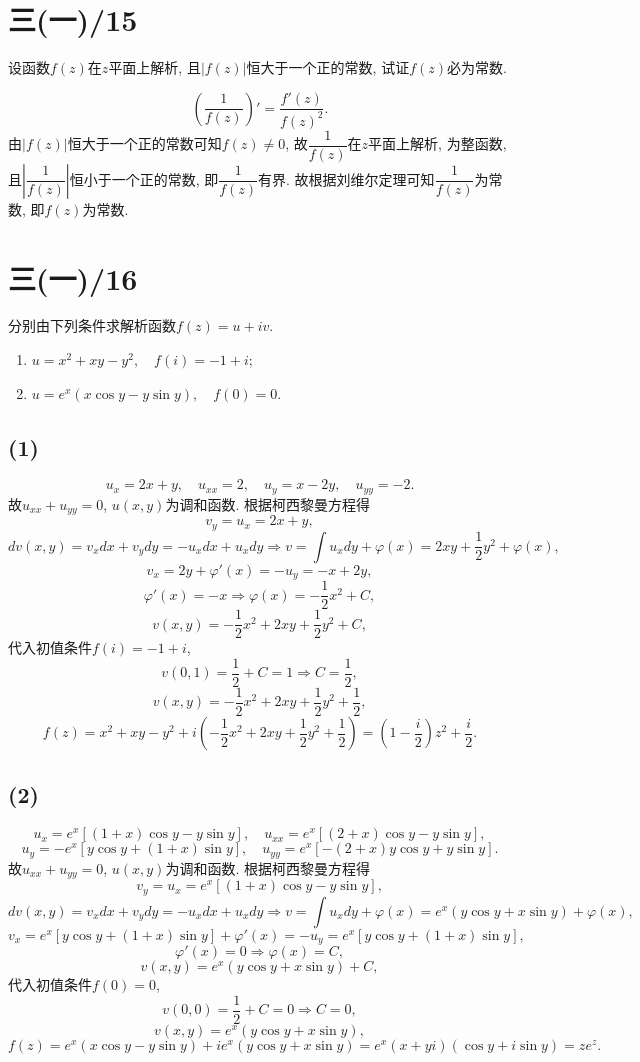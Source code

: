 \documentclass[11pt,a4paper]{article}
\author{刘逸灏 (515370910207)}
\begin{document}
\maketitle

\section{三(一)/15}
\begin{problem}
设函数$f(z)$在$z$平面上解析, 且$|f(z)|$恒大于一个正的常数, 试证$f(z)$必为常数.
\end{problem}
$$\left(\frac{1}{f(z)}\right)'=\frac{f'(z)}{f(z)^2}.$$
由$|f(z)|$恒大于一个正的常数可知$f(z)\neq 0$, 故$\dfrac{1}{f(z)}$在$z$平面上解析, 为整函数, 且$\left|\dfrac{1}{f(z)}\right|$恒小于一个正的常数, 即$\dfrac{1}{f(z)}$有界. 故根据刘维尔定理可知$\dfrac{1}{f(z)}$为常数, 即$f(z)$为常数.

\section{三(一)/16}
\begin{problem}
分别由下列条件求解析函数$f(z)=u+iv$.
\begin{enumerate}
  \item $u=x^2+xy-y^2,\quad f(i)=-1+i$;
  \item $u=e^x(x\cos y-y\sin y),\quad f(0)=0$.
\end{enumerate}
\end{problem}

\subsection*{(1)}
$$u_x=2x+y,\quad u_{xx}=2,\quad u_y=x-2y,\quad u_{yy}=-2.$$
故$u_{xx}+u_{yy}=0$, $u(x,y)$为调和函数. 根据柯西黎曼方程得
$$v_y=u_x=2x+y,$$
$$dv(x,y)=v_xdx+v_ydy=-u_xdx+u_xdy\Longrightarrow v=\int u_xdy+\varphi(x)=2xy+\frac{1}{2}y^2+\varphi(x),$$
$$v_x=2y+\varphi'(x)=-u_y=-x+2y,$$
$$\varphi'(x)=-x\Longrightarrow\varphi(x)=-\frac{1}{2}x^2+C,$$
$$v(x,y)=-\frac{1}{2}x^2+2xy+\frac{1}{2}y^2+C,$$
代入初值条件$f(i)=-1+i$,
$$v(0,1)=\frac{1}{2}+C=1\Longrightarrow C=\frac{1}{2},$$
$$v(x,y)=-\frac{1}{2}x^2+2xy+\frac{1}{2}y^2+\frac{1}{2},$$
$$f(z)=x^2+xy-y^2+i\left(-\frac{1}{2}x^2+2xy+\frac{1}{2}y^2+\frac{1}{2}\right)=\left(1-\frac{i}{2}\right)z^2+\frac{i}{2}.$$

\subsection*{(2)}
$$u_x=e^x[(1+x)\cos y-y\sin y],\quad u_{xx}=e^x[(2+x)\cos y-y\sin y],$$
$$u_y=-e^x[y\cos y+(1+x)\sin y],\quad u_{yy}=e^x[-(2+x)y\cos y+y\sin y].$$
故$u_{xx}+u_{yy}=0$, $u(x,y)$为调和函数. 根据柯西黎曼方程得
$$v_y=u_x=e^x[(1+x)\cos y-y\sin y],$$
$$dv(x,y)=v_xdx+v_ydy=-u_xdx+u_xdy\Longrightarrow v=\int u_xdy+\varphi(x)=e^x(y\cos y+x\sin y)+\varphi(x),$$
$$v_x=e^x[y\cos y+(1+x)\sin y]+\varphi'(x)=-u_y=e^x[y\cos y+(1+x)\sin y],$$
$$\varphi'(x)=0\Longrightarrow\varphi(x)=C,$$
$$v(x,y)=e^x(y\cos y+x\sin y)+C,$$
代入初值条件$f(0)=0$,
$$v(0,0)=\frac{1}{2}+C=0\Longrightarrow C=0,$$
$$v(x,y)=e^x(y\cos y+x\sin y),$$
$$f(z)=e^x(x\cos y-y\sin y)+ie^x(y\cos y+x\sin y)=e^x(x+yi)(\cos y+i\sin y)=ze^z.$$
\end{document}
